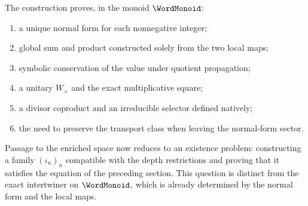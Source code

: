 The construction proves, in the monoid \(\WordMonoid\):
\begin{enumerate}
 \item a unique normal form for each nonnegative integer;
 \item global sum and product constructed solely from the two local maps;
 \item symbolic conservation of the value under quotient propagation;
 \item a unitary $W_\times$ and the exact multiplicative square;
 \item a divisor coproduct and an irreducible selector defined natively;
 \item the need to preserve the transport class when leaving the
normal-form sector.
\end{enumerate}

Passage to the enriched space now reduces to an existence problem:
constructing a family \((\iota_n)_n\) compatible with the depth restrictions
and proving that it satisfies the equation of the preceding section.
This question is distinct from the exact intertwiner on
\(\WordMonoid\), which is already determined by the normal form and the
local maps.
